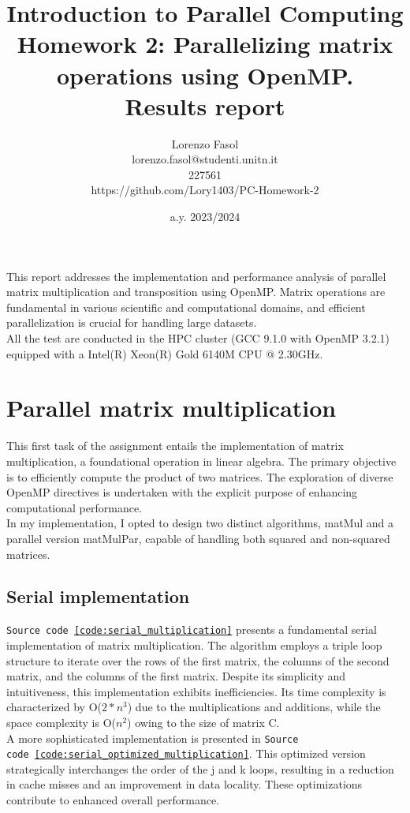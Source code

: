 \documentclass{article}
\begin{document}
\title{Introduction to Parallel Computing\\
    Homework 2: Parallelizing matrix operations using OpenMP.\\
    \textbf{Results report}
}
\author{Lorenzo Fasol\\lorenzo.fasol@studenti.unitn.it\\227561\\https://github.com/Lory1403/PC-Homework-2}
\date{a.y. 2023/2024}
\maketitle

This report addresses the implementation and performance analysis of parallel matrix multiplication and transposition using OpenMP. Matrix operations are fundamental in various scientific and computational domains, and efficient parallelization is crucial for handling large datasets.\\
All the test are conducted in the HPC cluster (GCC 9.1.0 with OpenMP 3.2.1) equipped with a Intel(R) Xeon(R) Gold 6140M CPU @ 2.30GHz.

\section{Parallel matrix multiplication}
This first task of the assignment entails the implementation of matrix multiplication, a foundational operation in linear algebra. The primary objective is to efficiently compute the product of two matrices. The exploration of diverse OpenMP directives is undertaken with the explicit purpose of enhancing computational performance.\\
In my implementation, I opted to design two distinct algorithms, matMul and a parallel version matMulPar, capable of handling both squared and non-squared matrices.

\subsection*{Serial implementation}
\texttt{Source code~\ref{code:serial_multiplication}} presents a fundamental serial implementation of matrix multiplication. The algorithm employs a triple loop structure to iterate over the rows of the first matrix, the columns of the second matrix, and the columns of the first matrix. Despite its simplicity and intuitiveness, this implementation exhibits inefficiencies. Its time complexity is characterized by O($2*n^3$) due to the multiplications and additions, while the space complexity is O($n^2$) owing to the size of matrix C.\\
A more sophisticated implementation is presented in \texttt{Source code~\ref{code:serial_optimized_multiplication}}. This optimized version strategically interchanges the order of the j and k loops, resulting in a reduction in cache misses and an improvement in data locality. These optimizations contribute to enhanced overall performance.
\end{document}
